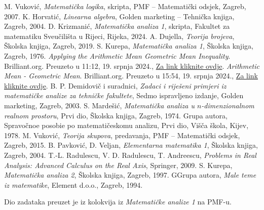 \newpage
\fancyhead[RO, RE]{}
\fancyhead[LO, LE]{}
\renewcommand{\headrulewidth}{0pt}
\begin{thebibliography}{20}
M. Vuković, \textit{Matematička logika}, skripta, PMF -- Matematički odsjek, Zagreb, 2007.
K. Horvatić, \textit{Linearna algebra}, Golden marketing -- Tehnička knjiga, Zagreb, 2004.
D. Krizmanić, \textit{Matematička analiza 1}, skripta, Fakultet za matematiku Sveučilišta u Rijeci, Rijeka, 2024.
A. Dujella, \textit{Teorija brojeva}, Školska knjiga, Zagreb, 2019.
S. Kurepa, \textit{Matematička analiza 1}, Školska knjiga, Zagreb, 1976.
\textit{Applying the Arithmetic Mean Geometric Mean Inequality}. Brilliant.org. Preuzeto u 11:12, 19. srpnja 2024., \href{https://brilliant.org/wiki/applying-the-arithmetic-mean-geometric-mean/}{Za link kliknite ovdje}.
\textit{Arithmetic Mean - Geometric Mean}. Brilliant.org. Preuzeto u 15:54, 19. srpnja 2024., \href{https://brilliant.org/wiki/arithmetic-mean-geometric-mean/}{Za link kliknite ovdje}.
B. P. Demidovič i suradnici, \textit{Zadaci i riješeni primjeri iz matematičke analize za tehničke fakultete}, Sedmo ispravljeno izdanje, Golden marketing, Zagreb, 2003.
 S. Mardešić, \textit{Matematička analiza u $n$-dimenzionalnom realnom prostoru}, Prvi dio, Školska knjiga, Zagreb, 1974.
 Grupa autora, \foreignlanguage{russian}{Spravočnoe posobie po matematičeskomu analizu, Prvi dio, Višča škola, Kijev, 1978.}
 M. Vuković, \textit{Teorija skupova}, predavanja, PMF -- Matematički odsjek, Zagreb, 2015.
 B. Pavković, D. Veljan, \textit{Elementarna matematika 1}, Školska knjiga, Zagreb, 2004.
 T.-L. Radulescu, V. D. Radulescu, T. Andreescu, \textit{Problems in Real Analysis: Advanced Calculus on the Real Axis}, Springer, 2009.
 S. Kurepa, \textit{Matematička analiza 2}, Školska knjiga, Zagreb, 1997.
\bibitem[15] GGrupa autora, \textit{Male teme iz matematike}, Element d.o.o., Zagreb, 1994.
\end{thebibliography}
Dio zadataka preuzet je iz kolokvija iz \textit{Matematičke analize 1} na PMF-u.